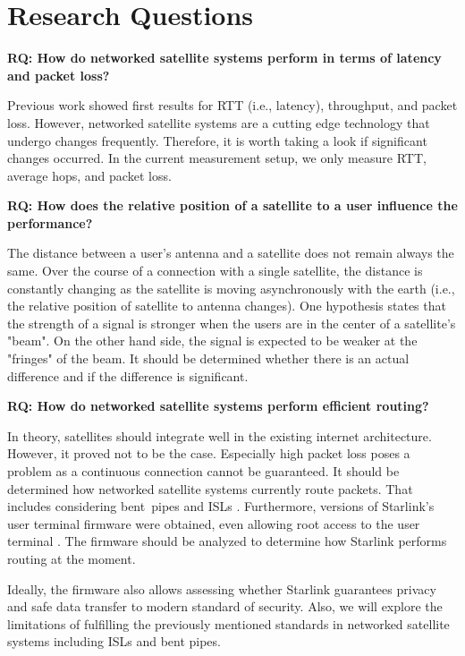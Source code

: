 \section{Research Questions} \label{sec:research-questions}

\begin{mdframed}
	\textbf{RQ: How do networked satellite systems perform in terms of latency and packet loss?}
\end{mdframed}

Previous work \cite{DBLP:conf/imc/MichelTGB22, DBLP:conf/infocom/MaCZCML23, Segan2020} showed first results for \ac{RTT} (i.e., latency), throughput, and packet loss. However, networked satellite systems are a cutting edge technology that undergo changes frequently. Therefore, it is worth taking a look if significant changes occurred. In the current measurement setup, we only measure \ac{RTT}, average hops, and packet loss.

\begin{mdframed}
	\textbf{RQ: How does the relative position of a satellite to a user influence the performance?}
\end{mdframed}

The distance between a user's antenna and a satellite does not remain always the same. Over the course of a connection with a single satellite, the distance is constantly changing as the satellite is moving asynchronously with the earth (i.e., the relative position of satellite to antenna changes).
One hypothesis states that the strength of a signal is stronger when the users are in the center of a satellite's "beam".
On the other hand side, the signal is expected to be weaker at the "fringes" of the beam. It should be determined whether there is an actual difference and if the difference is significant.

\begin{mdframed}
	\textbf{RQ: How do networked satellite systems perform efficient routing?}
\end{mdframed}

In theory, satellites should integrate well in the existing internet architecture. However, it proved not to be the case. Especially high packet loss \cite{DBLP:conf/infocom/MaCZCML23} poses a problem as a continuous connection cannot be guaranteed.
It should be determined how networked satellite systems currently route packets. That includes considering bent~pipes and ISLs \cite{Hauri2020}.
Furthermore, versions of Starlink's user terminal firmware were obtained, even allowing root access to the user terminal \cite{QuarkslabsBlogUserTerminalFirmsware, WoutersDumpingUserTerminalFirmware}.
The firmware should be analyzed to determine how Starlink performs routing at the moment.

Ideally, the firmware also allows assessing whether Starlink guarantees privacy and safe data transfer to modern standard of security.
Also, we will explore the limitations of fulfilling the previously mentioned standards in networked satellite systems including \ac{ISLs} and bent pipes.
